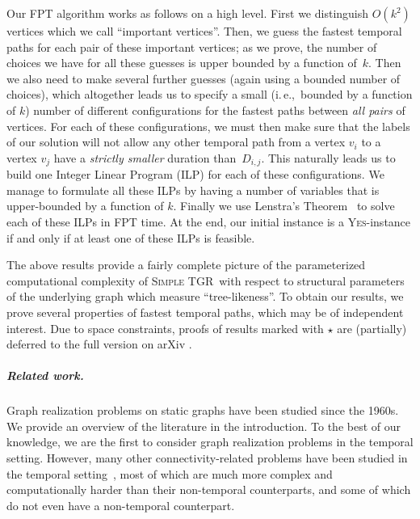 \documentclass[a4paper,UKenglish,cleveref, autoref, thm-restate]{lipics-v2021}
\newcommand{\ie}{i.\,e.,\ }
\newcommand{\deltaExact}{\textsc{Simple TGR}}
\begin{document}
Our FPT algorithm works as follows on a high level. 
First we distinguish $O(k^2)$ vertices which we call ``important vertices''. 
Then, we guess the fastest temporal paths for each pair of these important vertices; as we prove, the number of choices we have for all these guesses is upper bounded by a function of~$k$. 
Then we also need to make several further guesses (again using a bounded number of choices), which altogether leads us to specify a small (\ie bounded by a function of $k$) number of different configurations for the fastest paths between \emph{all pairs} of vertices. For each of these configurations, we must then make sure that the labels of our solution will not allow any other temporal path from a vertex $v_i$ to a vertex $v_j$ have a \emph{strictly smaller} duration than~$D_{i,j}$.
This naturally leads us to build one Integer Linear Program (ILP) for each of these configurations. We manage to formulate all these ILPs by having a number of variables that is upper-bounded by a function of $k$. Finally we use Lenstra's Theorem~\cite{Lenstra1983Integer} to solve each of these ILPs in FPT time. At the end, our initial instance is a \textsc{Yes}-instance if and only if at least one of these ILPs is feasible.




The above results provide a fairly complete picture of the parameterized computational complexity of \deltaExact\ with respect to structural parameters of the underlying graph which measure ``tree-likeness''. To obtain our results, we prove several properties of fastest temporal paths, which may be of independent interest. 
Due to space constraints, proofs of results marked with $\star$ are (partially) deferred to the full version on arXiv \cite{fullPaper}.

\subparagraph{Related work.} Graph realization problems on static graphs have been studied since the 1960s. We provide an overview of the literature in the introduction. 
To the best of our knowledge, we are the first to consider graph realization problems in the temporal setting. However, many other connectivity-related problems have been studied in the temporal setting~\cite{Mertzios-transitivity21,Akrida-explorer-21,enright2021deleting,MolterRZ21,klobas2023interference,deligkas2022optimizing,erlebach2021temporal,Flu+19a,Zsc+19,CasteigtsCS22,FuchsleMNR22}, most of which are much more complex and computationally harder than their non-temporal counterparts, and some of which do not even have a non-temporal counterpart.

\end{document}

